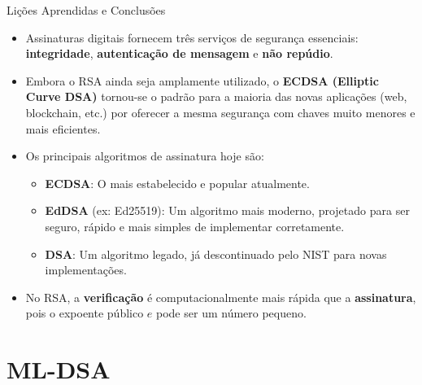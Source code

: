 \documentclass{beamer}
\begin{document}
\begin{frame}{Lições Aprendidas e Conclusões}

    \begin{itemize}
        \item<+-> Assinaturas digitais fornecem três serviços de segurança essenciais: \textbf{integridade}, \textbf{autenticação de mensagem} e \textbf{não repúdio}.
        
        \item<+-> Embora o RSA ainda seja amplamente utilizado, o \textbf{ECDSA (Elliptic Curve DSA)} tornou-se o padrão para a maioria das novas aplicações (web, blockchain, etc.) por oferecer a mesma segurança com chaves muito menores e mais eficientes.
        
        \item<+-> Os principais algoritmos de assinatura hoje são:
            \begin{itemize}
                \item \textbf{ECDSA}: O mais estabelecido e popular atualmente.
                \item \textbf{EdDSA} (ex: Ed25519): Um algoritmo mais moderno, projetado para ser seguro, rápido e mais simples de implementar corretamente.
                \item \textbf{DSA}: Um algoritmo legado, já descontinuado pelo NIST para novas implementações.
            \end{itemize}
        
        \item<+-> No RSA, a \textbf{verificação} é computacionalmente mais rápida que a \textbf{assinatura}, pois o expoente público $e$ pode ser um número pequeno.
        
    \end{itemize}

\end{frame}

\section{ML-DSA}
\end{document}

